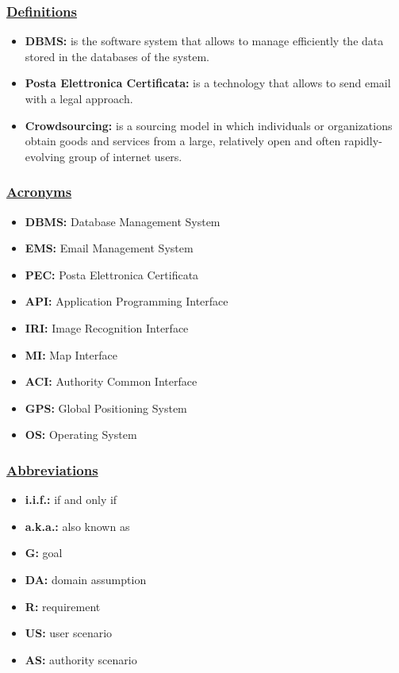 	\subsubsection[Definitions]{\hyperlink{toc}{Definitions}}
		\begin{itemize}
			\item \textbf{DBMS:} is the software system that allows to manage efficiently the data stored in the databases of the system.
			\item \textbf{Posta Elettronica Certificata:} is a technology that allows to send email with a legal approach.
			\item \textbf{Crowdsourcing:} is a sourcing model in which individuals or organizations obtain goods and services from a large, relatively open and often rapidly-evolving group of internet users.
		\end{itemize}
	
	\subsubsection[Acronyms]{\hyperlink{toc}{Acronyms}}
		\begin{itemize}
			\item \textbf{DBMS:} Database Management System
			\item \textbf{EMS:} Email Management System
			\item \textbf{PEC:} Posta Elettronica Certificata
			\item \textbf{API:} Application Programming Interface
			\item \textbf{IRI:} Image Recognition Interface
			\item \textbf{MI:} Map Interface
			\item \textbf{ACI:} Authority Common Interface
			\item \textbf{GPS:} Global Positioning System
			\item \textbf{OS:} Operating System
		\end{itemize}
	
	\subsubsection[Abbreviations]{\hyperlink{toc}{Abbreviations}}
		\begin{itemize}
	        \item \textbf{i.i.f.:} if and only if
	        \item \textbf{a.k.a.:} also known as
			\item \textbf{G:} goal
			\item \textbf{DA:} domain assumption
			\item \textbf{R:} requirement
			\item \textbf{US:} user scenario
			\item \textbf{AS:} authority scenario
		\end{itemize}
		
